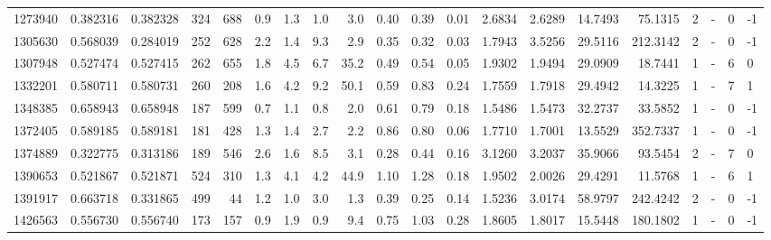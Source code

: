 \begin{tabular}{rrrrrrrrrrrrrrrrrlrl}
   1273940 & 0.382316 &   0.382328 &  324 &  688 &      0.9 &      1.3 &     1.0 &      3.0 &       0.40 &        0.39 &        0.01 &  2.6834 &  2.6289 &   14.7493 &   75.1315 &       2 &             - &        0 &        -1 \\
   1305630 & 0.568039 &   0.284019 &  252 &  628 &      2.2 &      1.4 &     9.3 &      2.9 &       0.35 &        0.32 &        0.03 &  1.7943 &  3.5256 &   29.5116 &  212.3142 &       2 &             - &        0 &        -1 \\
   1307948 & 0.527474 &   0.527415 &  262 &  655 &      1.8 &      4.5 &     6.7 &     35.2 &       0.49 &        0.54 &        0.05 &  1.9302 &  1.9494 &   29.0909 &   18.7441 &       1 &             - &        6 &         0 \\
   1332201 & 0.580711 &   0.580731 &  260 &  208 &      1.6 &      4.2 &     9.2 &     50.1 &       0.59 &        0.83 &        0.24 &  1.7559 &  1.7918 &   29.4942 &   14.3225 &       1 &             - &        7 &         1 \\
   1348385 & 0.658943 &   0.658948 &  187 &  599 &      0.7 &      1.1 &     0.8 &      2.0 &       0.61 &        0.79 &        0.18 &  1.5486 &  1.5473 &   32.2737 &   33.5852 &       1 &             - &        0 &        -1 \\
   1372405 & 0.589185 &   0.589181 &  181 &  428 &      1.3 &      1.4 &     2.7 &      2.2 &       0.86 &        0.80 &        0.06 &  1.7710 &  1.7001 &   13.5529 &  352.7337 &       1 &             - &        0 &        -1 \\
   1374889 & 0.322775 &   0.313186 &  189 &  546 &      2.6 &      1.6 &     8.5 &      3.1 &       0.28 &        0.44 &        0.16 &  3.1260 &  3.2037 &   35.9066 &   93.5454 &       2 &             - &        7 &         0 \\
   1390653 & 0.521867 &   0.521871 &  524 &  310 &      1.3 &      4.1 &     4.2 &     44.9 &       1.10 &        1.28 &        0.18 &  1.9502 &  2.0026 &   29.4291 &   11.5768 &       1 &             - &        6 &         1 \\
   1391917 & 0.663718 &   0.331865 &  499 &   44 &      1.2 &      1.0 &     3.0 &      1.3 &       0.39 &        0.25 &        0.14 &  1.5236 &  3.0174 &   58.9797 &  242.4242 &       2 &             - &        0 &        -1 \\
   1426563 & 0.556730 &   0.556740 &  173 &  157 &      0.9 &      1.9 &     0.9 &      9.4 &       0.75 &        1.03 &        0.28 &  1.8605 &  1.8017 &   15.5448 &  180.1802 &       1 &             - &        0 &        -1 \\

\end{tabular}

